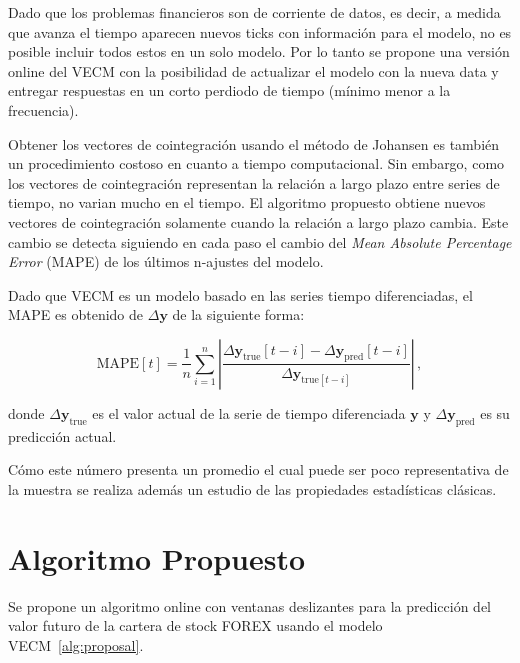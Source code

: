 Dado que los problemas financieros son de corriente de datos, es decir, a
medida que avanza el tiempo aparecen nuevos ticks con información para el
modelo, no es posible incluir todos estos en un solo modelo.  Por lo tanto se
propone una versión online del VECM con la posibilidad de actualizar el modelo
con la nueva data y entregar respuestas en un corto perdiodo de tiempo (mínimo
menor a la frecuencia).

Obtener los vectores de cointegración usando el método de Johansen es también
un procedimiento costoso en cuanto a tiempo computacional. Sin embargo, como
los vectores de cointegración representan la relación a largo plazo entre
series de tiempo, no varian mucho en el tiempo. El algoritmo propuesto obtiene
nuevos vectores de cointegración solamente cuando la relación a largo plazo
cambia. Este cambio se detecta siguiendo en cada paso el cambio del \emph{Mean
Absolute Percentage Error} (MAPE) de los últimos n-ajustes del modelo.

Dado que VECM es un modelo basado en las series tiempo diferenciadas, el MAPE
es obtenido de $\Delta \mathbf{y}$ de la siguiente forma:

\begin{equation}\label{eq:MAPE}
\text{MAPE}[t] = \frac{1}{n} \sum_{i=1}^{n} \left| 
\frac{\Delta \mathbf{y}_{\text{true}}[t-i]-\Delta
\mathbf{y}_{\text{pred}}[t-i]}{\Delta \mathbf{y}_{\text{true}[t-i]}}
\right| \, , 
\end{equation}

\noindent donde $\Delta \mathbf{y}_{\text{true}}$ es el valor actual de la
serie de tiempo diferenciada $\mathbf{y}$ y $\Delta \mathbf{y}_{\text{pred}}$
es su predicción actual.

Cómo este número presenta un promedio el cual puede ser poco representativa de
la muestra se realiza además un estudio de las propiedades estadísticas
clásicas.

\section{Algoritmo Propuesto}

Se propone un algoritmo online con ventanas deslizantes para la predicción del
valor futuro de la cartera de stock FOREX usando el modelo VECM~\ref{alg:proposal}. 

